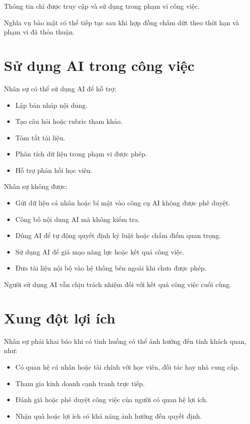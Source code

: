 \documentclass[12pt,a4paper]{article}
\begin{document}
Thông tin chỉ được truy cập và sử dụng trong phạm vi công việc.

Nghĩa vụ bảo mật có thể tiếp tục sau khi hợp đồng chấm dứt
theo thời hạn và phạm vi đã thỏa thuận.

\section{Sử dụng AI trong công việc}

Nhân sự có thể sử dụng AI để hỗ trợ:

\begin{itemize}
    \item Lập bản nháp nội dung.
    \item Tạo câu hỏi hoặc rubric tham khảo.
    \item Tóm tắt tài liệu.
    \item Phân tích dữ liệu trong phạm vi được phép.
    \item Hỗ trợ phản hồi học viên.
\end{itemize}

Nhân sự không được:

\begin{itemize}
    \item Gửi dữ liệu cá nhân hoặc bí mật vào công cụ AI không được phê duyệt.
    \item Công bố nội dung AI mà không kiểm tra.
    \item Dùng AI để tự động quyết định kỷ luật hoặc chấm điểm quan trọng.
    \item Sử dụng AI để giả mạo năng lực hoặc kết quả công việc.
    \item Đưa tài liệu nội bộ vào hệ thống bên ngoài khi chưa được phép.
\end{itemize}

Người sử dụng AI vẫn chịu trách nhiệm đối với kết quả công việc cuối cùng.

\section{Xung đột lợi ích}

Nhân sự phải khai báo khi có tình huống có thể ảnh hưởng đến tính khách quan, như:

\begin{itemize}
    \item Có quan hệ cá nhân hoặc tài chính với học viên, đối tác hay nhà cung cấp.
    \item Tham gia kinh doanh cạnh tranh trực tiếp.
    \item Đánh giá hoặc phê duyệt công việc của người có quan hệ lợi ích.
    \item Nhận quà hoặc lợi ích có khả năng ảnh hưởng đến quyết định.
\end{itemize}
\end{document}
